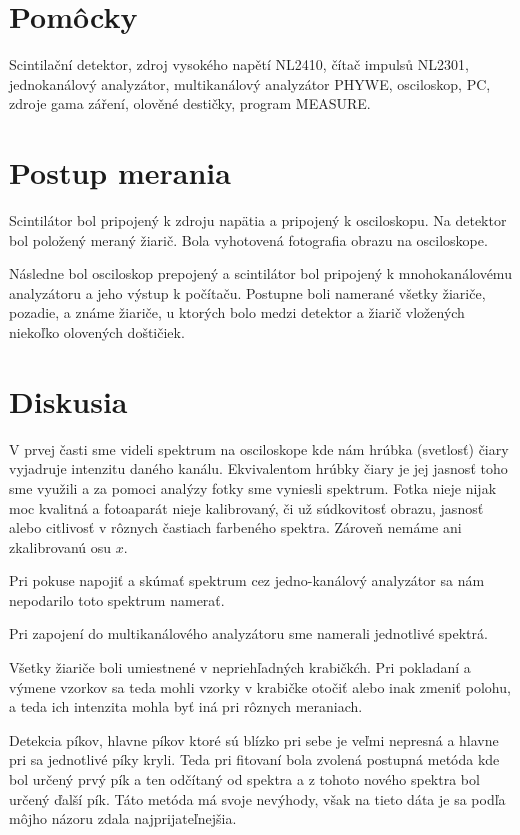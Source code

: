 \documentclass[10pt]{scrartcl}
\begin{document}
\MakeFJFIHead{}






\section{Pomôcky}

Scintilační detektor, zdroj vysokého napětí NL2410, čítač impulsů NL2301, jednokanálový
analyzátor, multikanálový analyzátor PHYWE, osciloskop, PC, zdroje gama
záření, olověné destičky, program MEASURE.

\section{Postup merania}
Scintilátor bol pripojený k zdroju napätia a pripojený k osciloskopu. 
Na detektor bol položený meraný žiarič.
Bola vyhotovená fotografia obrazu na osciloskope.


Následne bol osciloskop prepojený a scintilátor bol pripojený k mnohokanálovému analyzátoru a jeho výstup k počítaču.
Postupne boli namerané všetky žiariče, pozadie, a známe žiariče, u ktorých bolo medzi detektor a žiarič vložených niekoľko olovených doštičiek.




\section{Diskusia}

V prvej časti sme videli spektrum na osciloskope kde nám hrúbka (svetlosť) čiary vyjadruje intenzitu daného kanálu.
Ekvivalentom hrúbky čiary je jej jasnosť toho sme využili a za pomoci analýzy fotky sme vyniesli spektrum.
Fotka nieje nijak moc kvalitná a fotoaparát nieje kalibrovaný, či už súdkovitosť obrazu, jasnosť alebo citlivosť v rôznych častiach farbeného spektra.
Zároveň nemáme ani zkalibrovanú osu $x$.

Pri pokuse napojiť a skúmať spektrum cez jedno-kanálový analyzátor sa nám nepodarilo toto spektrum namerať.

Pri zapojení do multikanálového analyzátoru sme namerali jednotlivé spektrá. 

Všetky žiariče boli umiestnené v nepriehľadných krabičkćh. Pri pokladaní a výmene vzorkov sa teda mohli vzorky v krabičke otočiť alebo inak zmeniť polohu, a teda ich intenzita mohla byť iná pri rôznych meraniach.

Detekcia píkov, hlavne píkov ktoré sú blízko pri sebe je veľmi nepresná a hlavne pri  sa jednotlivé píky kryli. Teda pri fitovaní bola zvolená postupná metóda kde bol určený prvý pík a ten odčítaný od spektra a z tohoto nového spektra bol určený ďalší pík. Táto metóda má svoje nevýhody, však na tieto dáta je sa podľa môjho názoru zdala najprijateľnejšia. 
\end{document}
